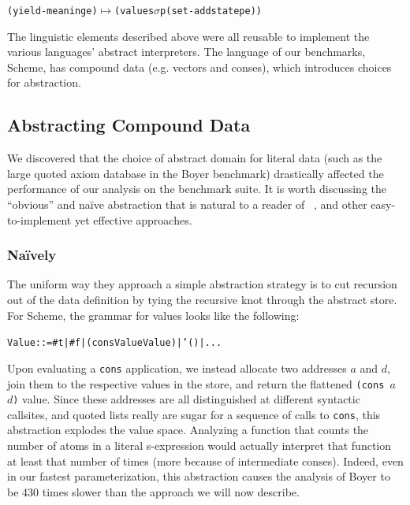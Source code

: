 \documentclass[preprint,onecolumn,9pt]{sigplanconf} %
\begin{document}
\begin{center}
\begin{alltt}
(yield-meaning e) \(\longmapsto\) (values \(\sigma\)p (set-add statep e))
\end{alltt}
\end{center}

The linguistic elements described above were all reusable to implement
the various languages' abstract interpreters. The language of our
benchmarks, Scheme, has compound data (e.g. vectors and conses), which
introduces choices for abstraction.

\subsection{Abstracting Compound Data}

We discovered that the choice of abstract domain for literal data
(such as the large quoted axiom database in the Boyer benchmark)
drastically affected the performance of our analysis on the benchmark
suite. It is worth discussing the ``obvious'' and na\"ive abstraction
that is natural to a reader of
~\citep{dvanhorn:VanHorn2011Abstracting}, and other easy-to-implement
yet effective approaches.

\subsubsection{Na\"ively}

The uniform way they approach a simple abstraction strategy is to cut
recursion out of the data definition by tying the recursive knot
through the abstract store. For Scheme, the grammar for values looks like the following:

\begin{alltt}
Value ::= #t | #f | (cons Value Value) | '() | ...
\end{alltt}

Upon evaluating a {\tt cons} application, we instead allocate two
addresses $a$ and $d$, join them to the respective values in the
store, and return the flattened {\tt (cons $a$ $d$)} value. Since
these addresses are all distinguished at different syntactic
callsites, and quoted lists really are sugar for a sequence of calls
to {\tt cons}, this abstraction explodes the value space. Analyzing a
function that counts the number of atoms in a literal s-expression
would actually interpret that function at least that number of times
(more because of intermediate conses). Indeed, even in our fastest
parameterization, this abstraction causes the analysis of Boyer to be
430 times slower than the approach we will now describe.
\end{document}
